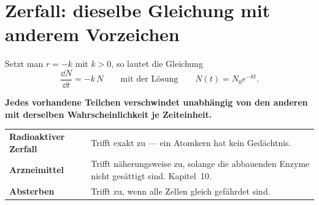 \begin{merksatz}
\begin{center}
\begin{minipage}{0.88\textwidth}
\end{minipage}
\end{center}
\end{merksatz}

\section{Zerfall: dieselbe Gleichung mit anderem Vorzeichen}

\begin{merksatz}
Setzt man $r = -k$ mit $k > 0$, so lautet die Gleichung
\[ \frac{\dd N}{\dd t} = -k\,N \qquad\text{mit der Lösung}\qquad N(t) = N_0e^{-kt} . \]

\begin{center}
\begin{minipage}{0.9\textwidth}
\textbf{Jedes vorhandene Teilchen verschwindet unabhängig von den anderen mit derselben Wahrscheinlichkeit je Zeiteinheit.}
\end{minipage}
\end{center}

\begin{center}
{\small
\renewcommand{\arraystretch}{1.5}
\begin{tabular}{@{}P{2.6cm}P{6.0cm}@{}}
\toprule
\textbf{Radioaktiver Zerfall} & Trifft exakt zu --- ein Atomkern hat kein Gedächtnis.\\
\textbf{Arzneimittel} & Trifft näherungsweise zu, solange die abbauenden Enzyme nicht gesättigt sind. Kapitel~10.\\
\textbf{Absterben} & Trifft zu, wenn alle Zellen gleich gefährdet sind.\\
\bottomrule
\end{tabular}}
\end{center}
\end{merksatz}

